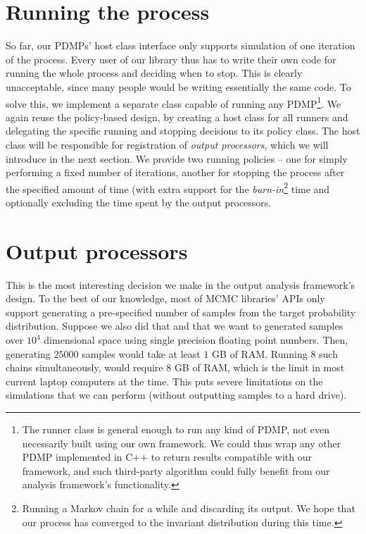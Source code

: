 \documentclass[report.tex]{subfiles}
\begin{document}
\section{Running the process}

So far, our PDMPs' host class interface only supports simulation of one iteration
of the process.
Every user of our library thus has to write their own code for running the whole process
and deciding when to stop. This is clearly unacceptable, since many people would be
writing essentially the same code.
To solve this, we implement a separate class capable of running any PDMP\footnote{
  The runner class is general enough to run any kind of PDMP, not even necessarily built
  using our own framework. We could thus wrap any other PDMP implemented in C++ to return
  results compatible with our framework, and such third-party algorithm could fully benefit
  from our analysis framework's functionality.
}. We again reuse the policy-based design, by creating a host class for all runners
and delegating the specific running and stopping decisions to its policy class.
The host class will be responsible for registration of \textit{output processors}, which we will
introduce in the next section. We provide two running policies -- one for simply
performing a fixed number of iterations, another for stopping the process after
the specified amount of time (with extra support for the
\textit{burn-in}\footnote{Running a Markov chain
for a while and discarding its output. We hope that our process has converged to the invariant distribution
during this time.
} time and optionally excluding the time spent by the output processors.


\section{Output processors}
\label{section-output-processors}

This is the most interesting decision we make in the output analysis framework's design.
To the best of our knowledge, most of MCMC libraries' APIs only support generating
a pre-specified number of samples from the target probability distribution.
Suppose we also did that and that we want to generated samples over $10^{4}$ dimensional space
using single precision floating point numbers.
Then, generating $25000$ samples would take at least $1$ GB of RAM. Running 8 such
chains simultaneously, would require $8$ GB of RAM, which is the limit in most
current laptop computers at the time. This puts severe limitations on the simulations that we can perform (without
outputting samples to a hard drive).
\end{document}
